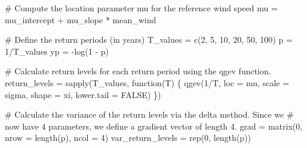 \documentclass[
  letterpaper,
  DIV=11,
  numbers=noendperiod]{scrartcl}
\newenvironment{Shaded}{\begin{snugshade}}{\end{snugshade}}
\newcommand{\AttributeTok}[1]{\textcolor[rgb]{0.40,0.45,0.13}{#1}}
\newcommand{\CommentTok}[1]{\textcolor[rgb]{0.37,0.37,0.37}{#1}}
\newcommand{\ConstantTok}[1]{\textcolor[rgb]{0.56,0.35,0.01}{#1}}
\newcommand{\ControlFlowTok}[1]{\textcolor[rgb]{0.00,0.23,0.31}{#1}}
\newcommand{\DecValTok}[1]{\textcolor[rgb]{0.68,0.00,0.00}{#1}}
\newcommand{\FunctionTok}[1]{\textcolor[rgb]{0.28,0.35,0.67}{#1}}
\newcommand{\NormalTok}[1]{\textcolor[rgb]{0.00,0.23,0.31}{#1}}
\newcommand{\OtherTok}[1]{\textcolor[rgb]{0.00,0.23,0.31}{#1}}
\newcommand{\SpecialCharTok}[1]{\textcolor[rgb]{0.37,0.37,0.37}{#1}}
\begin{document}
\begin{Shaded}
\begin{Highlighting}[]
\CommentTok{\# Compute the location parameter mu for the reference wind speed}
\NormalTok{mu }\OtherTok{=}\NormalTok{ mu\_intercept }\SpecialCharTok{+}\NormalTok{ mu\_slope }\SpecialCharTok{*}\NormalTok{ mean\_wind}

\CommentTok{\# Define the return periods (in years)}
\NormalTok{T\_values }\OtherTok{=} \FunctionTok{c}\NormalTok{(}\DecValTok{2}\NormalTok{, }\DecValTok{5}\NormalTok{, }\DecValTok{10}\NormalTok{, }\DecValTok{20}\NormalTok{, }\DecValTok{50}\NormalTok{, }\DecValTok{100}\NormalTok{)}
\NormalTok{p }\OtherTok{=} \DecValTok{1}\SpecialCharTok{/}\NormalTok{T\_values}
\NormalTok{yp }\OtherTok{=} \SpecialCharTok{{-}}\FunctionTok{log}\NormalTok{(}\DecValTok{1} \SpecialCharTok{{-}}\NormalTok{ p)}

\CommentTok{\# Calculate return levels for each return period using the qgev function.}
\NormalTok{return\_levels }\OtherTok{=} \FunctionTok{sapply}\NormalTok{(T\_values, }\ControlFlowTok{function}\NormalTok{(T) \{}
    \FunctionTok{qgev}\NormalTok{(}\DecValTok{1}\SpecialCharTok{/}\NormalTok{T, }\AttributeTok{loc =}\NormalTok{ mu, }\AttributeTok{scale =}\NormalTok{ sigma, }\AttributeTok{shape =}\NormalTok{ xi, }\AttributeTok{lower.tail =} \ConstantTok{FALSE}\NormalTok{)}
\NormalTok{\})}

\CommentTok{\# Calculate the variance of the return levels via the delta method.  Since we}
\CommentTok{\# now have 4 parameters, we define a gradient vector of length 4.}
\NormalTok{grad }\OtherTok{=} \FunctionTok{matrix}\NormalTok{(}\DecValTok{0}\NormalTok{, }\AttributeTok{nrow =} \FunctionTok{length}\NormalTok{(p), }\AttributeTok{ncol =} \DecValTok{4}\NormalTok{)}
\NormalTok{var\_return\_levels }\OtherTok{=} \FunctionTok{rep}\NormalTok{(}\DecValTok{0}\NormalTok{, }\FunctionTok{length}\NormalTok{(p))}


\end{Highlighting}
\end{Shaded}
\end{document}
